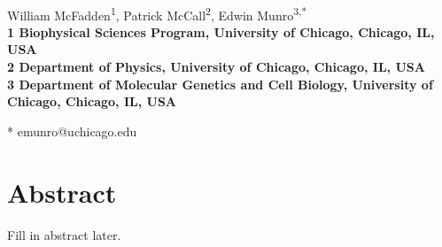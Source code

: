 \documentclass[10pt,letterpaper]{article}
\date{}
\begin{document}
\vspace*{0.35in}

\begin{flushleft}
{\Large
\textbf{}
}
\newline
\\
William McFadden\textsuperscript{1},
Patrick McCall\textsuperscript{2},
Edwin Munro\textsuperscript{3,*}
\\
\bigskip
\bf{1} Biophysical Sciences Program, University of Chicago, Chicago, IL, USA
\\
\bf{2} Department of Physics, University of Chicago, Chicago, IL, USA
\\
\bf{3} Department of Molecular Genetics and Cell Biology, University of Chicago, Chicago, IL, USA
\\
\bigskip

% 
%





* emunro@uchicago.edu

\end{flushleft}
\section*{Abstract}
Fill in abstract later.
\end{document}
